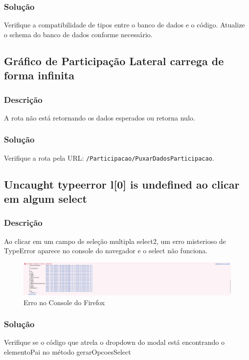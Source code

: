 \documentclass[12pt]{article}
\begin{document}
\subsubsection{Solução}
Verifique a compatibilidade de tipos entre o banco de dados e o código. Atualize o schema do banco de dados conforme necessário.

\subsection{Gráfico de Participação Lateral carrega de forma infinita}
\subsubsection{Descrição}
A rota não está retornando os dados esperados ou retorna nulo.

\subsubsection{Solução}
Verifique a rota pela URL: \texttt{/Participacao/PuxarDadosParticipacao}.

\subsection{Uncaught typeerror l[0] is undefined ao clicar em algum select}

\subsubsection{Descrição}
Ao clicar em um campo de seleção multipla select2, um erro misterioso de TypeError aparece no console do navegador e o select não funciona.

\begin{figure}[h!]
    \includegraphics[width=\linewidth]{Imagens/typeerrorselect.png}
    \caption{Erro no Console do Firefox}
\end{figure}

\subsubsection{Solução}
Verifique se o código que atrela o dropdown do modal está encontrando o elementoPai no método gerarOpcoesSelect
\end{document}

